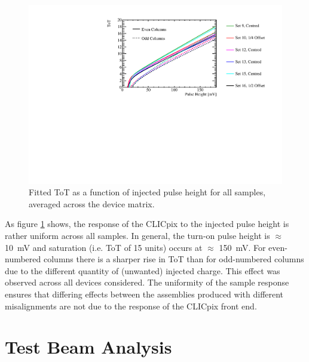 \begin{figure}
\centering
\includegraphics[width=1.0\textwidth]{CLICdpVertex/Plots/TestPulseCalibration/FitParam/AverageToT_vs_InjectedPulseHeight.pdf}
\caption[Fitted CLICpix ToT as a function of injected pulse height averaged across the device matrix.]{Fitted ToT as a function of injected pulse height for all samples, averaged across the device matrix.}
\label{fig:testpulsemeanfit}
\end{figure}

As figure \ref{fig:testpulsemeanfit} shows, the response of the CLICpix to the injected pulse height is rather uniform across all samples.  In general, the turn-on pulse height is $\approx$ 10~mV and saturation (i.e. ToT of 15 units) occurs at $\approx$ 150~mV.  For even-numbered columns there is a sharper rise in ToT than for odd-numbered columns due to the different quantity of (unwanted) injected charge. This effect was observed across all devices considered. The uniformity of the sample response ensures that differing effects between the assemblies produced with different misalignments are not due to the response of the CLICpix front end.


\section{Test Beam Analysis}
\label{sec:testbeam}


